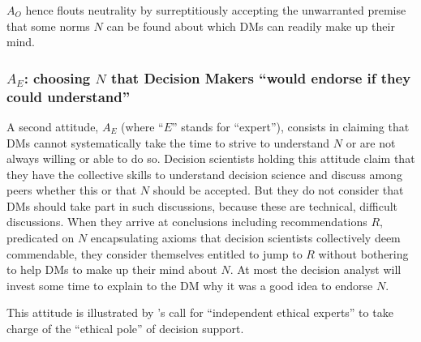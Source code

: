 \documentclass[preprint, french, english, 11pt, authoryear]{elsarticle}%
\newcommand{\protectforpdf}[1]{\texorpdfstring{\ensuremath{#1}}{#1}}
\begin{document}
$A_O$ hence flouts neutrality by surreptitiously accepting the unwarranted premise that 
some norms $N$ can be found about which \acp{DM} can readily make up their mind.

\subsubsection{\texorpdfstring{$A_E$}{AE}: choosing \protectforpdf{N} that Decision Makers %
 “would endorse if they could understand”}

A second attitude, $A_E$ (where ``$E$'' stands for “expert”), consists in claiming that \acp{DM} cannot systematically take the time to strive to understand $N$ or are not always willing or able to do so. Decision scientists holding this attitude claim that they have the collective skills to understand decision science and discuss among peers whether this or that $N$ should be accepted. But they do not consider that \acp{DM} should take part in such discussions, because these are technical, difficult discussions. When they arrive at conclusions including recommendations $R$, predicated on $N$ encapsulating axioms that decision scientists collectively deem commendable, they consider themselves entitled to jump to $R$ without bothering to help \acp{DM} to make up their mind about $N$. %
At most the decision analyst will invest some time to explain to the \ac{DM} why it was a good idea to endorse $N$. %
\begin{changebar}
This attitude is illustrated by \citet{brans_ethics_2002}'s call for ``independent ethical experts'' to take charge of the ``ethical pole'' of decision support.%
\end{changebar}
\end{document}
